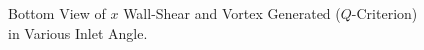 \begin{figure}
    \centering
    \noindent{}
    \caption{Bottom View of $x$ Wall-Shear and Vortex Generated ($Q$-Criterion) in Various Inlet Angle.}
    \label{fig:3D_OF_BOTTOM_VIEW_COMPARE_DIFF_IN}
\end{figure}
